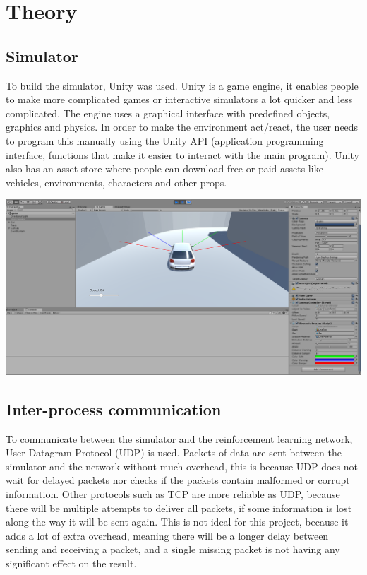 \documentclass{article}
\begin{document}
\newpage

\section{Theory}
\subsection{Simulator}
To build the simulator, Unity was used. Unity is a game engine, it enables people to make more complicated games or interactive simulators a lot quicker and less complicated. The engine uses a graphical interface with predefined objects, graphics and physics. In order to make the environment act/react, the user needs to program this manually using the Unity API (application programming interface, functions that make it easier to interact with the main program). Unity also has an asset store where people can download free or paid assets like vehicles, environments, characters and other props. 

\begin{center}
\includegraphics[width=\linewidth]{simulator_env}
\end{center}

\subsection{Inter-process communication}
To communicate between the simulator and the reinforcement learning network, User Datagram Protocol (UDP) is used. Packets of data are sent between the simulator and the network without much overhead, this is because UDP does not wait for delayed packets nor checks if the packets contain malformed or corrupt information. Other protocols such as TCP are more reliable as UDP, because there will be multiple attempts to deliver all packets, if some information is lost along the way it will be sent again. This is not ideal for this project, because it adds a lot of extra overhead, meaning there will be a longer delay between sending and receiving a packet, and a single missing packet is not having any significant effect on the result.
\end{document}
